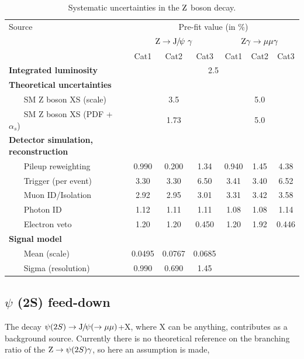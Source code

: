 	\begin{table}[!ht]
	\scriptsize
	  \begin{center}
	    
	    \begin{tabular}{lcccccc}
	      \hline
	      Source & \multicolumn{6}{c}{Pre-fit value (in \%)} \\
	      \cline{2-7}
	      & \multicolumn{3}{c}{$\mathrm{Z}\rightarrow{\mathrm{J}\hspace{-.08em}/\hspace{-.14em}\psi}\ \gamma$} & \multicolumn{3}{c}{$\mathrm{Z}\gamma\to\mu\mu\gamma$}\\
	      & Cat1 & Cat2 & Cat3 & Cat1 & Cat2 & Cat3\\
	      \hline
	      \textbf{Integrated luminosity} & \multicolumn{6}{c}{2.5}\\
	      \textbf{Theoretical uncertainties} & \multicolumn{6}{c}{ } \\
	      ~~~ SM Z boson XS (scale) & \multicolumn{3}{c}{3.5} & \multicolumn{3}{c}{5.0}\\
	      ~~~ SM Z boson XS (PDF + $\alpha_{s}$) & \multicolumn{3}{c}{1.73} & \multicolumn{3}{c}{5.0}\\
	      \textbf{Detector simulation, reconstruction} & \multicolumn{6}{c}{ } \\
	      ~~~ Pileup reweighting          & 0.990 & 0.200 & 1.34 & 0.940 & 1.45 & 4.38 \\
	      ~~~ Trigger (per event)& 3.30 & 3.30 & 6.50 & 3.41 & 3.40 & 6.52 \\
	      ~~~ Muon ID/Isolation & 2.92 & 2.95 & 3.01 & 3.31 & 3.42 & 3.58 \\
	      ~~~ Photon ID & 1.12 & 1.11 & 1.11 & 1.08 & 1.08 & 1.14 \\
	      ~~~ Electron veto & 1.20 & 1.20 & 0.450 & 1.20 & 1.92 & 0.446 \\
	      \textbf{Signal model} & \multicolumn{6}{c}{ } \\
	      ~~~ Mean (scale) & 0.0495 & 0.0767 & 0.0685 &  \multicolumn{3}{c}{\mdash}\\
	      ~~~ Sigma (resolution)  & 0.990 & 0.690 & 1.45 & \multicolumn{3}{c}{\mdash}\\
	      \hline
	    \end{tabular}
	    \caption{Systematic uncertainties in the $\mathrm{Z}$ boson decay.\label{tab:systZ}}
	  \end{center}
	\end{table}
	
	\subsection*{$\psi$ (2S) feed-down}
	The decay $\psi (2S)\to{\mathrm{J}\hspace{-.08em}/\hspace{-.14em}\psi}(\to\mu\mu)$+X, where X can be anything, contributes as a background source. 
	Currently there is no theoretical reference on the branching ratio of the $\mathrm{Z}\to\psi (2S)\gamma$, so here an assumption is made,
	
